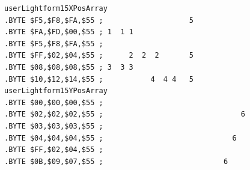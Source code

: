 \begin{minipage}[b]{0.48\linewidth}
\begin{lrbox}{\mybox}%
\begin{lstlisting}[basicstyle=\ttfamily\tiny,escapechar=\%]
userLightform15XPosArray
.BYTE $F5,$F8,$FA,$55 ;                    5            
.BYTE $FA,$FD,$00,$55 ; 1  1 1                          
.BYTE $F5,$F8,$FA,$55 ;                                 
.BYTE $FF,$02,$04,$55 ;      2  2  2       5            
.BYTE $08,$08,$08,$55 ; 3  3 3                          
.BYTE $10,$12,$14,$55 ;           4  4 4   5            
userLightform15YPosArray
.BYTE $00,$00,$00,$55 ;                                 
.BYTE $02,$02,$02,$55 ;                                6
.BYTE $03,$03,$03,$55 ;                                 
.BYTE $04,$04,$04,$55 ;                              6  
.BYTE $FF,$02,$04,$55 ;                                 
.BYTE $0B,$09,$07,$55 ;                            6    
\end{lstlisting}
\end{lrbox}%
\scalebox{0.8}{\usebox{\mybox}}

\end{minipage}
%

